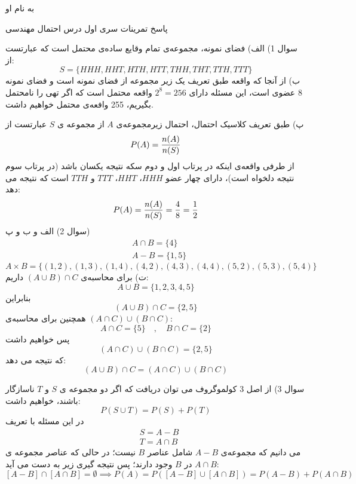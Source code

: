 \documentclass[10pt,letterpaper]{article}
\begin{document}
\Large
\begin{center}
به نام او

پاسخ تمرینات سری اول درس احتمال مهندسی

\hrulefill
\end{center}
سوال 1) الف) فضای نمونه، مجموعه‌ی تمام وقایع ساده‌ی محتمل است که عبارتست از:
$$
S=\{HHH,HHT,HTH,HTT,THH,THT,TTH,TTT\}
$$
ب) از آنجا که واقعه طبق تعریف یک زیر مجموعه از فضای نمونه است و فضای نمونه 8 عضوی است، این مسئله دارای $2^8=256$ واقعه محتمل است که اگر تهی را نامحتمل بگیریم، 255 وافعه‌ی محتمل خواهیم داشت.

پ) طبق تعریف کلاسیک احتمال، احتمال زیرمجموعه‌ی $A$ از مجموعه ی $S$ عبارتست از
$$
P(A)={n(A)\over n(S)}
$$
از طرفی واقعه‌ی اینکه در پرتاب اول و دوم سکه نتیجه یکسان باشد (در پرتاب سوم نتیجه دلخواه است)، دارای چهار عضو $HHH$، $HHT$، $TTT$ و $TTH$ است که نتیجه می دهد:
$$
P(A)={n(A)\over n(S)}={4\over8}={1\over2}
$$
سوال 2) الف و ب و پ)
\[
\begin{split}
&A\cap B=\{4\}
\\&A-B=\{1,5\}
\end{split}
\]
$$
A\times B=\{(1,2),(1,3),(1,4),(4,2),(4,3),(4,4),(5,2),(5,3),(5,4)\}
$$
ت) برای محاسبه‌ی 
$
(A\cup B)\cap C
$
داریم:
$$
A\cup B=\{1,2,3,4,5\}
$$
بنابراین
$$
(A\cup B)\cap C=\{2,5\}
$$
همچنین برای محاسبه‌ی $(A\cap C)\cup (B\cap C)$:
$$
A\cap C=\{5\}\quad,\quad B\cap C=\{2\}
$$
پس خواهیم داشت
$$
(A\cap C)\cup(B\cap C)=\{2,5\}
$$
که نتیجه می دهد:
$$
(A\cup B)\cap C=(A\cap C)\cup (B\cap C)
$$

سوال 3) از اصل 3 کولموگروف می توان دریافت که اگر دو مجموعه ی $S$ و $T$ ناسازگار باشند، خواهیم داشت:
$$
P(S\cup T)=P(S)+P(T)
$$
در این مسئله با تعریف
\[
\begin{split}
&S=A-B
\\&T=A\cap B
\end{split}
\]
می دانیم که مجموعه‌ی $A-B$ شامل عناصر $B$ نیست؛ در حالی که عناصر مجموعه ی $A\cap B$ در $B$ وجود دارند؛ پس نتیجه گیری زیر به دست می آید:
$$
[A-B]\cap[A\cap B]=\emptyset\implies P(A)=P([A-B]\cup[A\cap B])=P(A-B)+P(A\cap B)
$$
\end{document}
